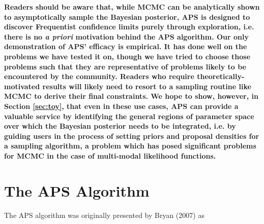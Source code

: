 \documentclass[useAMS,usenatbib]{aastex}
\begin{document}
{\bf %
Readers should be aware that, while MCMC can be analytically shown to
asymptotically sample the Bayesian posterior, APS is designed to discover
Frequentist confidence limits purely through exploration, i.e. there is no {\it a
priori} motivation behind the APS algorithm.  Our only demonstration of APS'
efficacy is empirical.  It has done well on the problems we have tested it on,
though we have tried to choose those problems such that they are representative of
problems likely to be encountered by the community.  Readers who require
theoretically-motivated results will likely need to resort to a sampling routine
like MCMC to derive their final constraints.  We hope to show, however, in Section
\ref{sec:toy}, that even in these use cases, APS can provide a valuable service by
identifying the general regions of parameter space over which the Bayesian
posterior needs to be integrated, i.e. by guiding users in the process of setting
priors and proposal densities for a sampling algorithm, 
a problem which has posed significant problems
for MCMC in the case of multi-modal likelihood functions.
} %


\section{The APS Algorithm}
\label{sec:algorithm}

The APS algorithm was originally presented by Bryan (2007) as
\end{document}

